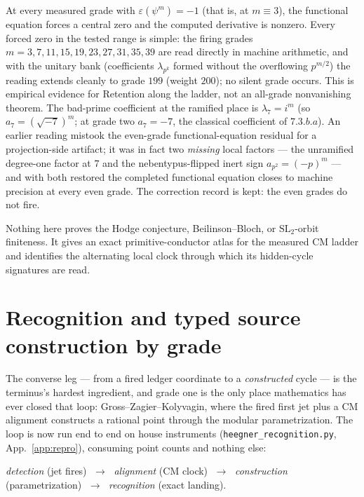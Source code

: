 \documentclass[11pt]{article}
\theoremstyle{definition}
\theoremstyle{remark}
\begin{document}
At every measured grade with $\varepsilon(\psi^m)=-1$ (that is, at
$m\equiv3$), the functional equation forces a central zero and the computed
derivative is nonzero.  Every forced zero in the tested range is simple: the
firing grades $m=3,7,11,15,19,23,27,31,35,39$ are read directly in machine
arithmetic, and with the unitary bank (coefficients $\lambda_{p^{k}}$ formed
without the overflowing $p^{m/2}$) the reading extends cleanly to grade
$199$ (weight $200$); no silent grade occurs.  This is empirical evidence for
Retention along the ladder, not an all-grade nonvanishing theorem.  The
bad-prime coefficient at the ramified place is $\lambda_7=i^m$ (so
$a_7=(\sqrt{-7})^m$; at grade two $a_7=-7$, the classical coefficient of
$7.3.b.a$).  An earlier reading mistook the even-grade functional-equation
residual for a projection-side artifact; it was in fact two \emph{missing}
local factors --- the unramified degree-one factor at $7$ and the
nebentypus-flipped inert sign $a_{p^2}=(-p)^m$ --- and with both restored the
completed functional equation closes to machine precision at every even
grade.  The correction record is kept: the even grades do not fire.

Nothing here proves the Hodge conjecture, Beilinson--Bloch, or
$\mathrm{SL}_2$-orbit finiteness.  It gives an exact primitive-conductor
atlas for the measured CM ladder and identifies the alternating local clock
through which its hidden-cycle signatures are read.

\section{Recognition and typed source construction by grade}\label{sec:recognition}

The converse leg --- from a fired ledger coordinate to a \emph{constructed}
cycle --- is the terminus's hardest ingredient, and grade one is the only place
mathematics has ever closed that loop: Gross--Zagier--Kolyvagin, where the
fired first jet plus a CM alignment constructs a rational point through the
modular parametrization. The loop is now run end to end on house instruments
(\texttt{heegner\_recognition.py}, App.~\ref{app:repro}), consuming point
counts and nothing else:

\begin{center}
\emph{detection} (jet fires) $\;\to\;$ \emph{alignment} (CM clock)
$\;\to\;$ \emph{construction} (parametrization) $\;\to\;$
\emph{recognition} (exact landing).
\end{center}
\end{document}
